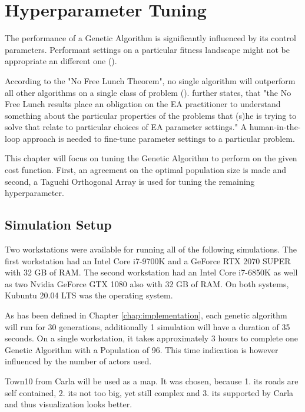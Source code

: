 \chapter{Hyperparameter Tuning}
\label{chap:hyperparameter_tuning}
The performance of a Genetic Algorithm is significantly influenced by its control parameters. Performant settings on a particular fitness landscape might not be appropriate an different one (\cite{kacprzyk_parameter_2007}).

According to the "No Free Lunch Theorem", no single algorithm will outperform all other algorithms on a single class of problem (\cite{kacprzyk_parameter_2007}). \cite{kacprzyk_parameter_2007} further states, that "the No Free Lunch results place an obligation on the EA practitioner to understand something about the particular properties of the problems that (s)he is trying to solve that relate to particular choices of EA parameter settings."
A human-in-the-loop approach is needed to fine-tune parameter settings to a particular problem.

This chapter will focus on tuning the Genetic Algorithm to perform on the given cost function. First, an agreement on the optimal population size is made and second, a Taguchi Orthogonal Array is used for tuning the remaining hyperparameter.

\section{Simulation Setup}
Two workstations were available for running all of the following simulations. The first workstation had an Intel Core i7-9700K and a GeForce RTX 2070 SUPER with 32 GB of RAM. The second workstation had an Intel Core i7-6850K as well as two Nvidia GeForce GTX 1080 also with 32 GB of RAM. On both systems, Kubuntu 20.04 LTS was the operating system.

As has been defined in Chapter \ref{chap:implementation}, each genetic algorithm will run for 30 generations, additionally 1 simulation will have a duration of 35 seconds. On a single workstation, it takes approximately 3 hours to complete one Genetic Algorithm with a Population of 96. This time indication is however influenced by the number of actors used. 

Town10 from Carla will be used as a map. It was chosen, because 1. its roads are self contained, 2. its not too big, yet still complex and 3. its supported by Carla and thus visualization looks better.

